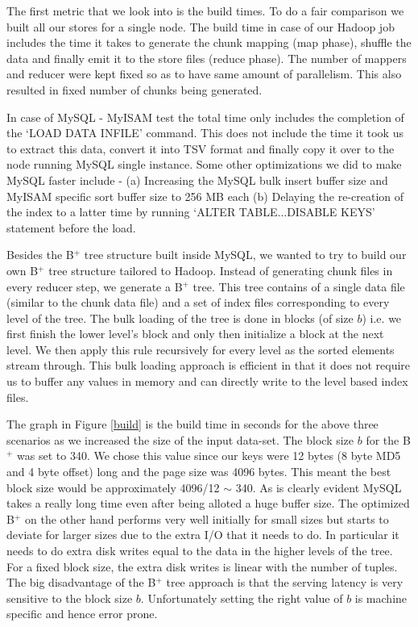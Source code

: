 The first metric that we look into is the build times. To do a fair comparison we built all our stores for a single node. The build time in case of our Hadoop job includes the time it takes to generate the chunk mapping (map phase), shuffle the data and finally emit it to the store files (reduce phase). The number of mappers and reducer were kept fixed so as to have same amount of parallelism. This also resulted in fixed number of chunks being generated.

In case of MySQL - MyISAM test the total time only includes the completion of the `LOAD DATA INFILE' command. This does not include the time it took us to extract this data, convert it into TSV format and finally copy it over to the node running MySQL single instance. Some other optimizations we did to make MySQL faster include - (a) Increasing the MySQL bulk insert buffer size and MyISAM specific sort buffer size to 256 MB each (b) Delaying the re-creation of the index to a latter time by running `ALTER TABLE...DISABLE KEYS' statement before the load. 

Besides the B$^{+}$ tree structure built inside MySQL, we wanted to try to build our own B$^{+}$ tree structure tailored to Hadoop. Instead of generating chunk files in every reducer step, we generate a B$^{+}$ tree. This tree contains of a single data file (similar to the chunk data file) and a set of index files corresponding to every level of the tree. The bulk loading of the tree is done in blocks (of size $b$) i.e. we first finish the lower level's block and only then initialize a block at the next level. We then apply this rule recursively for every level as the sorted elements stream through. This bulk loading approach is efficient in that it does not require us to buffer any values in memory and can directly write to the level based index files. 

The graph in Figure \ref{build} is the build time in seconds for the above three scenarios as we increased the size of the input data-set. The block size $b$ for the B$^{+}$ was set to 340. We chose this value since our keys were 12 bytes (8 byte MD5 and 4 byte offset) long and the page size was 4096 bytes. This meant the best block size would be approximately 4096/12 $\sim$ 340. As is clearly evident MySQL takes a really long time even after being alloted a huge buffer size. The optimized B$^{+}$ on the other hand performs very well initially for small sizes but starts to deviate for larger sizes due to the extra I/O that it needs to do. In particular it needs to do extra disk writes equal to the data in the higher levels of the tree. For a fixed block size, the extra disk writes is linear with the number of tuples. The big disadvantage of the B$^{+}$ tree approach is that the serving latency is very sensitive to the block size $b$. Unfortunately setting the right value of $b$ is machine specific and hence error prone. 

